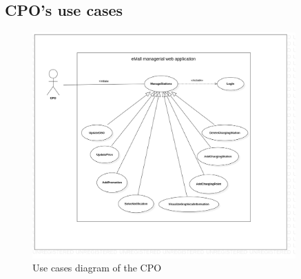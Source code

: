 \subsection{CPO's use cases}
\begin{figure}[H]
    \centering
    \includegraphics[width= 0.9\textwidth, trim={2cm 5cm 5cm 3cm}, clip]{Images/cp3/UseCaseDiagramCPO.png}
    \caption{Use cases diagram of the CPO}
\end{figure}
